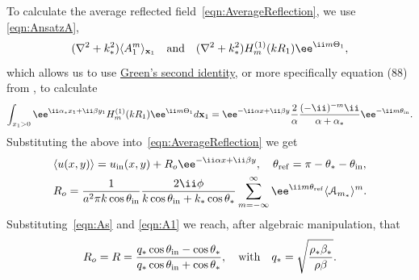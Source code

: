 \documentclass[ 12pt, a4paper]{article}
\begin{document}
To calculate the average reflected field~\eqref{eqn:AverageReflection}, we use \eqref{eqn:AnsatzA},
\[
(\nabla^2 +k_\eff^2) \ensem{A_1^m}_{\mathbf x_1} \quad \text{and} \quad (\nabla^2 +k_\eff^2)  H_m^{(1)}(k R_1) \ee^{\ii m \Theta_1},
\]
which allows us to use \href{https://en.wikipedia.org/wiki/Green%27s_identities}{Green's second identity}, or more specifically equation (88) from \cite{gower_reflection_2017}, to calculate
\begin{equation}
  \int_{x_1 >0} \ee^{\ii \alpha_\eff x_1 +\ii \beta y_1}  H_m^{(1)}(k R_1) \ee^{\ii m \Theta_1}  d \mathbf x_1 =
  \ee^{-\ii \alpha x + \ii \beta y } \frac{2}{\alpha}\frac{(-\ii)^{-m} \ii}{\alpha + \alpha_\eff} \ee^{-\ii m \theta_\inc}.
\end{equation}
Substituting the above into~\eqref{eqn:AverageReflection} we get
\begin{align}
  &\ensem{u(x,y)} = u_\inc(x,y) + R_o \ee^{-\ii \alpha x + \ii \beta y}, \quad  \theta_\reflect = \pi - \theta_\eff - \theta_\inc,
\\
  & R_o =  \frac{1}{a^2 \pi k \cos \theta_\inc }\frac{2 \ii \phi}{k \cos \theta_\inc +  k_\eff \cos \theta_\eff} \sum_{m=-\infty}^\infty \ee^{\ii m \theta_\reflect} \ensem{\A{{m}_\eff}}^m.
  \label{eqn:ReflectionEnsemble}
\end{align}
Substituting~\eqref{eqn:As} and \eqref{eqn:A1} we reach, after algebraic manipulation, that
\[
R_o = R = \frac{q_* \cos \theta_{\mathrm{in}} - \cos \theta_*}{q_* \cos \theta_{\mathrm{in}} + \cos \theta_*}, \quad \text{with} \quad q_* = \sqrt{\frac{\rho_* \beta_*}{\rho \beta}}.
\]


\printbibliography
\end{document}
